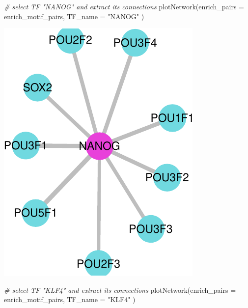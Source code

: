 \documentclass[
]{article}
\newenvironment{Shaded}{}{}
\newcommand{\AttributeTok}[1]{\textcolor[rgb]{0.49,0.56,0.16}{#1}}
\newcommand{\CommentTok}[1]{\textcolor[rgb]{0.38,0.63,0.69}{\textit{#1}}}
\newcommand{\FunctionTok}[1]{\textcolor[rgb]{0.02,0.16,0.49}{#1}}
\newcommand{\NormalTok}[1]{#1}
\newcommand{\StringTok}[1]{\textcolor[rgb]{0.25,0.44,0.63}{#1}}
\begin{document}
\begin{Shaded}
\begin{Highlighting}[]

\CommentTok{\# select TF "NANOG" and extract its connections}
\FunctionTok{plotNetwork}\NormalTok{(}\AttributeTok{enrich\_pairs =}\NormalTok{ enrich\_motif\_pairs, }
            \AttributeTok{TF\_name =} \StringTok{"NANOG"}
\NormalTok{            )}
\end{Highlighting}
\end{Shaded}

\includegraphics{enrichmotifpairR_user_manual_guide_files/figure-latex/H1_ESC_6-2.pdf}

\begin{Shaded}
\begin{Highlighting}[]

\CommentTok{\# select TF "KLF4" and extract its connections}
\FunctionTok{plotNetwork}\NormalTok{(}\AttributeTok{enrich\_pairs =}\NormalTok{ enrich\_motif\_pairs, }
            \AttributeTok{TF\_name =} \StringTok{"KLF4"}
\NormalTok{            )}
\end{Highlighting}
\end{Shaded}
\end{document}
